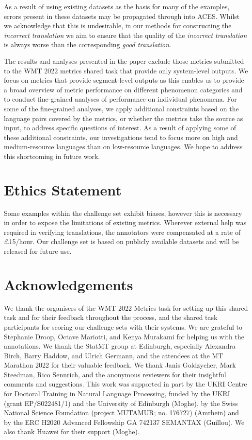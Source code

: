 \documentclass[11pt]{article}
\begin{document}
As a result of using existing datasets as the basis for many of the examples, errors present in these datasets may be propagated through into ACES. Whilst we acknowledge that this is undesirable, in our methods for constructing the \textit{incorrect translation} we aim to ensure that the quality of the \textit{incorrect translation} is always worse than the corresponding \textit{good translation}.

The results and analyses presented in the paper exclude those metrics submitted to the WMT 2022 metrics shared task that provide only system-level outputs. We focus on metrics that provide segment-level outputs as this enables us to provide a broad overview of metric performance on different phenomenon categories and to conduct fine-grained analyses of performance on individual phenomena. For some of the fine-grained analyses, we apply additional constraints based on the language pairs covered by the metrics, or whether the metrics take the source as input, to address specific questions of interest. As a result of applying some of these additional constraints, our investigations tend to focus more on high and medium-resource languages than on low-resource languages. We hope to address this shortcoming in future work.

\section*{Ethics Statement}
Some examples within the challenge set exhibit biases, however this is necessary in order to expose the limitations of existing metrics. Wherever external help was required in verifying translations, the annotators were compensated at a rate of £15/hour. 
Our challenge set is based on publicly available datasets and will be released for future use. 

\section*{Acknowledgements}
We thank the organisers of the WMT 2022 Metrics task for setting up this shared task and for their feedback throughout the process, and the shared task participants for scoring our challenge sets with their systems. We are grateful to Stephanie Droop, Octave Mariotti, and Kenya Murakami for helping us with the annotations. We thank the StatMT group at Edinburgh, especially Alexandra Birch, Barry Haddow, and Ulrich Germann, and the attendees at the MT Marathon 2022 for their valuable feedback. We thank Janis Goldzycher, Mark Steedman, Rico Sennrich, and the anonymous reviewers for their insightful comments and suggestions. This work was supported in part by the UKRI Centre for Doctoral Training in Natural Language Processing, funded by the UKRI (grant EP/S022481/1) and the University of Edinburgh (Moghe), by the Swiss National Science Foundation (project MUTAMUR; no. 176727) (Amrhein) and by the ERC H2020 Advanced Fellowship GA 742137 SEMANTAX (Guillou). We also thank Huawei for their support (Moghe).
\end{document}
